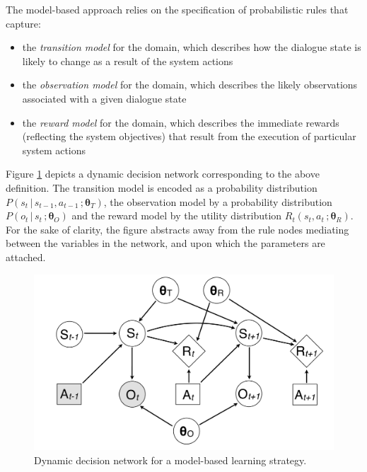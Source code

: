 The model-based approach relies on the specification of probabilistic rules that capture:
\begin{itemize}
\item the \textit{transition model} for the domain, which describes how the dialogue state is likely to change as a result of the system actions
\item the \textit{observation model} for the domain, which describes the likely observations associated with a given dialogue state
\item the \textit{reward model} for the domain, which describes the immediate rewards (reflecting the system objectives) that result from the execution of particular system actions
\end{itemize}

Figure \ref{fig:modelbasediagram} depicts a dynamic decision network corresponding to the above definition. The transition model is encoded as a probability distribution $P(s_t \, | \, s_{t-1}, a_{t-1} \,; \boldsymbol\theta_T)$, the observation model by a probability distribution $P(o_t \, | \, s_t\,; \boldsymbol\theta_O)$ and the reward model by the utility distribution $R_t(s_t,a_t\,; \boldsymbol\theta_R)$. For the sake of clarity, the figure abstracts away from the rule nodes mediating between the variables in the network, and upon which the parameters are attached.

\begin{figure}[h]
\centering
\includegraphics[scale=0.25]{imgs/modelbaseddiagram.pdf}
\caption{Dynamic decision network for a model-based learning strategy.}
\label{fig:modelbasediagram}
\end{figure}

